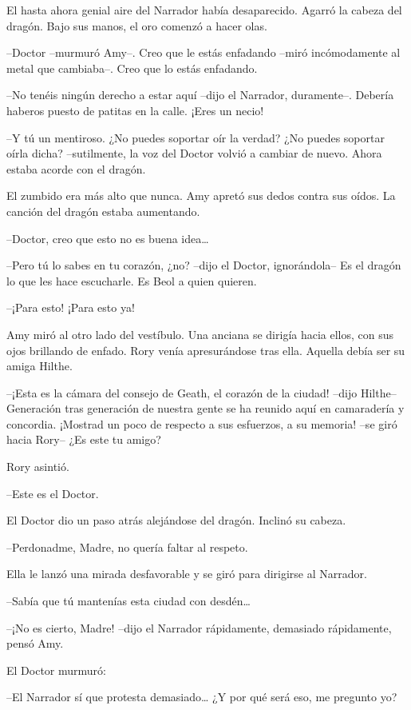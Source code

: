 {El hasta ahora genial aire del Narrador había desaparecido. Agarró la
cabeza del dragón. Bajo sus manos, el oro comenzó a hacer olas.}

{--Doctor --murmuró Amy--. Creo que le estás enfadando --miró
incómodamente al metal que cambiaba--. Creo que lo estás enfadando.}

{--No tenéis ningún derecho a estar aquí --dijo el Narrador,
	duramente--. Debería haberos puesto de patitas en la calle. ¡Eres un
necio!}

{--Y tú un mentiroso. ¿No puedes soportar oír la verdad? ¿No puedes
	soportar oírla dicha? --sutilmente, la voz del Doctor volvió a cambiar
de nuevo. Ahora estaba acorde con el dragón.}

{El zumbido era más alto que nunca. Amy apretó sus dedos contra sus
oídos. La canción del dragón estaba aumentando.}

{--Doctor, creo que esto no es buena idea\ldots{}}

{--Pero tú lo sabes en tu corazón, ¿no? --dijo el Doctor,
	ignorándola-- Es el dragón lo que les hace escucharle. Es Beol a quien
quieren.}

{--¡Para esto! ¡Para esto ya!}

{Amy miró al otro lado del vestíbulo. Una anciana se dirigía hacia
	ellos, con sus ojos brillando de enfado. Rory venía apresurándose tras
ella. Aquella debía ser su amiga Hilthe.}

{--¡Esta es la cámara del consejo de Geath, el corazón de la ciudad!
	--dijo Hilthe-- Generación tras generación de nuestra gente se ha
	reunido aquí en camaradería y concordia. ¡Mostrad un poco de respecto a
sus esfuerzos, a su memoria! --se giró hacia Rory-- ¿Es este tu amigo?}

{Rory asintió.}

{--Este es el Doctor.}

{El Doctor dio un paso atrás alejándose del dragón. Inclinó su cabeza.}

{--Perdonadme, Madre, no quería faltar al respeto.}

{Ella le lanzó una mirada desfavorable y se giró para dirigirse al
Narrador.}

{--Sabía que tú mantenías esta ciudad con desdén\ldots{}}

{--¡No es cierto, Madre! --dijo el Narrador rápidamente, demasiado
rápidamente, pensó Amy.}

{El Doctor murmuró:}

{--El Narrador sí que protesta demasiado\ldots{} ¿Y por qué será eso,
me pregunto yo?}

